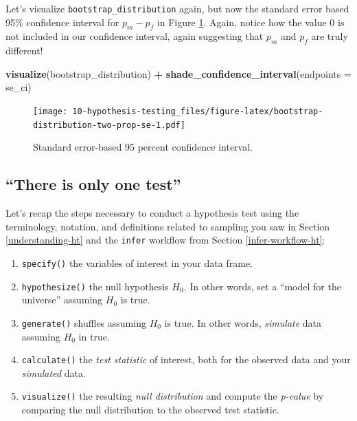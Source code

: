 \documentclass[
]{book}
\newenvironment{Shaded}{\begin{snugshade}}{\end{snugshade}}
\newcommand{\DataTypeTok}[1]{\textcolor[rgb]{0.13,0.29,0.53}{#1}}
\newcommand{\KeywordTok}[1]{\textcolor[rgb]{0.13,0.29,0.53}{\textbf{#1}}}
\newcommand{\NormalTok}[1]{#1}
\newcommand{\OperatorTok}[1]{\textcolor[rgb]{0.81,0.36,0.00}{\textbf{#1}}}
\newcommand{\StringTok}[1]{\textcolor[rgb]{0.31,0.60,0.02}{#1}}
\providecommand{\tightlist}{%
  \setlength{\itemsep}{0pt}\setlength{\parskip}{0pt}}
\begin{document}
Let's visualize \texttt{bootstrap\_distribution} again, but now the standard error based 95\% confidence interval for \(p_{m} - p_{f}\) in Figure \ref{fig:bootstrap-distribution-two-prop-se}. Again, notice how the value 0 is not included in our confidence interval, again suggesting that \(p_{m}\) and \(p_{f}\) are truly different!

\begin{Shaded}
\begin{Highlighting}[]
\KeywordTok{visualize}\NormalTok{(bootstrap_distribution) }\OperatorTok{+}\StringTok{ }
\StringTok{  }\KeywordTok{shade_confidence_interval}\NormalTok{(}\DataTypeTok{endpoints =}\NormalTok{ se_ci)}
\end{Highlighting}
\end{Shaded}

\begin{figure}
\centering
\texttt{[image: 10-hypothesis-testing\_files/figure-latex/bootstrap-distribution-two-prop-se-1.pdf]}
\caption{\label{fig:bootstrap-distribution-two-prop-se}Standard error-based 95 percent confidence interval.}
\end{figure}

\hypertarget{only-one-test}{%
\subsection{``There is only one test''}\label{only-one-test}}

Let's recap the steps necessary to conduct a hypothesis test using the terminology, notation, and definitions related to sampling you saw in Section \ref{understanding-ht} and the \texttt{infer} workflow from Section \ref{infer-workflow-ht}:

\begin{enumerate}
\def\labelenumi{\arabic{enumi}.}
\tightlist
\item
  \texttt{specify()} the variables of interest in your data frame.
\item
  \texttt{hypothesize()} the null hypothesis \(H_0\). In other words, set a ``model for the universe'' assuming \(H_0\) is true.
\item
  \texttt{generate()} shuffles assuming \(H_0\) is true. In other words, \emph{simulate} data assuming \(H_0\) in true.
\item
  \texttt{calculate()} the \emph{test statistic} of interest, both for the observed data and your \emph{simulated} data.
\item
  \texttt{visualize()} the resulting \emph{null distribution} and compute the \emph{p-value} by comparing the null distribution to the observed test statistic.
\end{enumerate}
\end{document}

